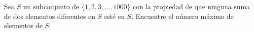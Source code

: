 Sea $S$ un subconjunto de $\{1,2,3,\ldots,1000\}$ con la propiedad de que ninguna suma de dos elementos diferentes en $S$ esté en $S$. Encuentre el número máximo de elementos de $S$.
